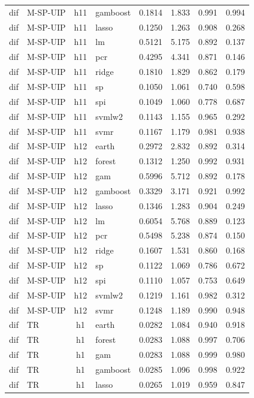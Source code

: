 \begin{ThreePartTable}
\begin{longtable}[t]{llclcccc}
dif & M-SP-UIP & h11 & gamboost & 0.1814 & 1.833 & 0.991 & 0.994\\
dif & M-SP-UIP & h11 & lasso & 0.1250 & 1.263 & 0.908 & 0.268\\
dif & M-SP-UIP & h11 & lm & 0.5121 & 5.175 & 0.892 & 0.137\\
dif & M-SP-UIP & h11 & pcr & 0.4295 & 4.341 & 0.871 & 0.146\\
dif & M-SP-UIP & h11 & ridge & 0.1810 & 1.829 & 0.862 & 0.179\\
dif & M-SP-UIP & h11 & sp & 0.1050 & 1.061 & 0.740 & 0.598\\
dif & M-SP-UIP & h11 & spi & 0.1049 & 1.060 & 0.778 & 0.687\\
dif & M-SP-UIP & h11 & svmlw2 & 0.1143 & 1.155 & 0.965 & 0.292\\
dif & M-SP-UIP & h11 & svmr & 0.1167 & 1.179 & 0.981 & 0.938\\
\addlinespace
dif & M-SP-UIP & h12 & earth & 0.2972 & 2.832 & 0.892 & 0.314\\
dif & M-SP-UIP & h12 & forest & 0.1312 & 1.250 & 0.992 & 0.931\\
dif & M-SP-UIP & h12 & gam & 0.5996 & 5.712 & 0.892 & 0.178\\
dif & M-SP-UIP & h12 & gamboost & 0.3329 & 3.171 & 0.921 & 0.992\\
dif & M-SP-UIP & h12 & lasso & 0.1346 & 1.283 & 0.904 & 0.249\\
dif & M-SP-UIP & h12 & lm & 0.6054 & 5.768 & 0.889 & 0.123\\
dif & M-SP-UIP & h12 & pcr & 0.5498 & 5.238 & 0.874 & 0.150\\
dif & M-SP-UIP & h12 & ridge & 0.1607 & 1.531 & 0.860 & 0.168\\
dif & M-SP-UIP & h12 & sp & 0.1122 & 1.069 & 0.786 & 0.672\\
dif & M-SP-UIP & h12 & spi & 0.1110 & 1.057 & 0.753 & 0.649\\
dif & M-SP-UIP & h12 & svmlw2 & 0.1219 & 1.161 & 0.982 & 0.312\\
dif & M-SP-UIP & h12 & svmr & 0.1248 & 1.189 & 0.990 & 0.948\\
\addlinespace
dif & TR & h1 & earth & 0.0282 & 1.084 & 0.940 & 0.918\\
dif & TR & h1 & forest & 0.0283 & 1.088 & 0.997 & 0.706\\
dif & TR & h1 & gam & 0.0283 & 1.088 & 0.999 & 0.980\\
dif & TR & h1 & gamboost & 0.0285 & 1.096 & 0.998 & 0.922\\
dif & TR & h1 & lasso & 0.0265 & 1.019 & 0.959 & 0.847\\

\end{longtable}
\end{ThreePartTable}
